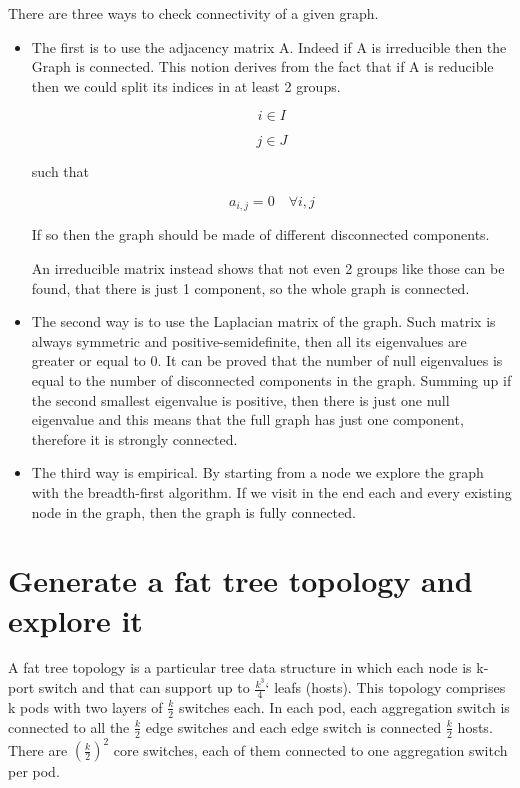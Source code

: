 \documentclass[10pt,a4paper]{article}
\begin{document}
There are three ways to check connectivity of a given graph.
\begin{itemize}

\item{The first is to use the adjacency matrix A. Indeed if A is irreducible then the Graph is connected. This notion derives from the fact that if A is reducible then we could split its indices in at least 2 groups.

$$ i \in I $$

$$ j \in J$$

such that

$$a_{i,j} = 0 \quad \forall  i,j$$

If so then the graph should be made of different disconnected components. 

An irreducible matrix instead shows that not even 2 groups like those can be found, that there is just 1 component, so the whole graph is connected.}

\item{The second way is to use the Laplacian matrix of the graph.
Such matrix is always symmetric and positive-semidefinite, then all its eigenvalues are greater or equal to 0. 
It can be proved that the number of null eigenvalues is equal to the number of disconnected components in the graph. 
Summing up if the second smallest eigenvalue is positive, then there is just one null eigenvalue and this means that the full graph has just one component,
therefore it is strongly connected.}

\item{The third way is empirical. 
By starting from a node we explore the graph with the breadth-first algorithm. 
If we visit in the end each and every existing node in the graph, then the graph is fully connected.}

\end{itemize}

\section{Generate a fat tree topology and explore it}

A fat tree topology is a particular tree data structure in which each node is k-port switch and that can support up to $\frac{k^3}{4}$` leafs (hosts). This topology comprises k pods with two layers of $\frac{k}{2}$ switches each. In each pod, each aggregation switch is connected to all the $\frac{k}{2}$ edge switches and each edge switch is connected $\frac{k}{2}$ hosts. There are  $(\frac{k}{2})^2$ core switches, each of them connected to one aggregation switch per pod.
    
\end{document}

